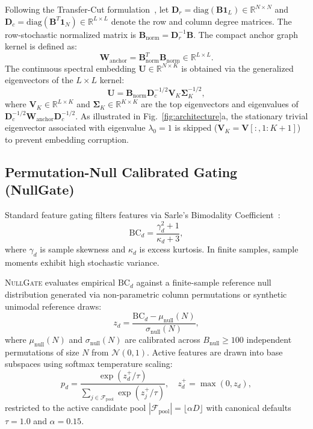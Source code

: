\documentclass[preprint,12pt]{elsarticle}
\begin{document}
Following the Transfer-Cut formulation~\cite{nie2024fast,wang2026normalized}, let $\mathbf{D}_r = \text{diag}(\mathbf{B} \mathbf{1}_L) \in \mathbb{R}^{N \times N}$ and $\mathbf{D}_c = \text{diag}(\mathbf{B}^T \mathbf{1}_N) \in \mathbb{R}^{L \times L}$ denote the row and column degree matrices. The row-stochastic normalized matrix is $\mathbf{B}_{\text{norm}} = \mathbf{D}_r^{-1} \mathbf{B}$. The compact anchor graph kernel is defined as:
\begin{equation}
    \mathbf{W}_{\text{anchor}} = \mathbf{B}_{\text{norm}}^T \mathbf{B}_{\text{norm}} \in \mathbb{R}^{L \times L}.
\end{equation}
The continuous spectral embedding $\mathbf{U} \in \mathbb{R}^{N \times K}$ is obtained via the generalized eigenvectors of the $L \times L$ kernel:
\begin{equation}
    \mathbf{U} = \mathbf{B}_{\text{norm}} \mathbf{D}_c^{-1/2} \mathbf{V}_K \mathbf{\Sigma}_K^{-1/2},
\end{equation}
where $\mathbf{V}_K \in \mathbb{R}^{L \times K}$ and $\mathbf{\Sigma}_K \in \mathbb{R}^{K \times K}$ are the top eigenvectors and eigenvalues of $\mathbf{D}_c^{-1/2} \mathbf{W}_{\text{anchor}} \mathbf{D}_c^{-1/2}$. As illustrated in Fig.~\ref{fig:architecture}a, the stationary trivial eigenvector associated with eigenvalue $\lambda_0 = 1$ is skipped ($\mathbf{V}_K = \mathbf{V}[:, 1:K+1]$) to prevent embedding corruption.

\subsection{Permutation-Null Calibrated Gating (NullGate)}
Standard feature gating filters features via Sarle's Bimodality Coefficient~\cite{sarle1983sas}:
\begin{equation}
    \text{BC}_d = \frac{\gamma_d^2 + 1}{\kappa_d + 3},
\end{equation}
where $\gamma_d$ is sample skewness and $\kappa_d$ is excess kurtosis. In finite samples, sample moments exhibit high stochastic variance.

\textsc{NullGate} evaluates empirical $\text{BC}_d$ against a finite-sample reference null distribution generated via non-parametric column permutations or synthetic unimodal reference draws:
\begin{equation}
    z_d = \frac{\text{BC}_d - \mu_{\text{null}}(N)}{\sigma_{\text{null}}(N)},
\end{equation}
where $\mu_{\text{null}}(N)$ and $\sigma_{\text{null}}(N)$ are calibrated across $B_{\text{null}} \ge 100$ independent permutations of size $N$ from $\mathcal{N}(0, 1)$. Active features are drawn into base subspaces using softmax temperature scaling:
\begin{equation}
    p_d = \frac{\exp(z_d^+ / \tau)}{\sum_{j \in \mathcal{F}_{\text{pool}}} \exp(z_j^+ / \tau)}, \quad z_d^+ = \max(0, z_d),
\end{equation}
restricted to the active candidate pool $|\mathcal{F}_{\text{pool}}| = \lfloor \alpha D \rfloor$ with canonical defaults $\tau = 1.0$ and $\alpha = 0.15$.
\end{document}
